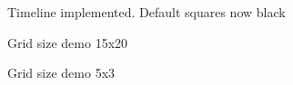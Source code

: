 \documentclass[11pt]{article} %
\begin{document}
  \begin{figure}[H]
  	\centering
  	\caption{Timeline implemented. Default squares now black}
  	\label{fig:GUI Design 5}
  \end{figure}  
  
  \begin{figure}[H]
  	\centering
  	\caption{Grid size demo 15x20}
  	\label{fig:GUI Design 5 size demo 1}
  \end{figure} 
  
  \begin{figure}[H]
  	\centering
  	\caption{Grid size demo 5x3}
  	\label{fig:GUI Design 5 size demo 2}
  \end{figure} 
  
\end{document}
